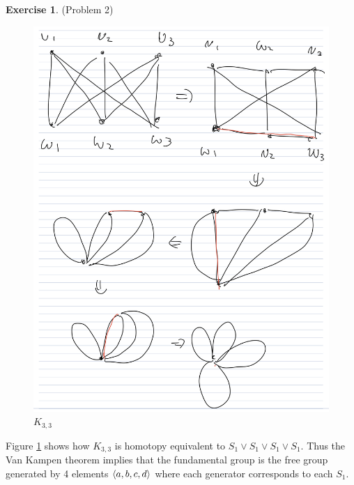 \documentclass[12pt, psamsfonts]{amsart}
\theoremstyle{definition}
\newtheorem*{exer}{Exercise}
\theoremstyle{remark}
\numberwithin{equation}{section}
\begin{document}
\begin{exer}{(Problem 2)}
 \begin{figure}
   \includegraphics[width=.5\linewidth]{k33.jpeg}
   \caption{$K_{3, 3}$}
   \label{fig:k33}
 \end{figure}
 Figure \ref{fig:k33} shows how $K_{3, 3}$ is homotopy equivalent to $S_1 \vee S_1 \vee S_1 \vee S_1$.
 Thus the Van Kampen theorem implies that the fundamental group is the free group generated by 4 elements $\ev{ a, b, c, d }$ where each generator corresponds to each $S_1$.
\end{exer}
\end{document}
